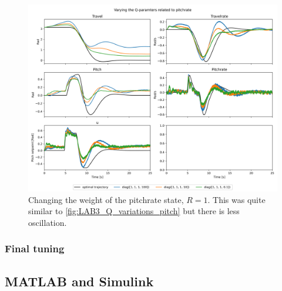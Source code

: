 \documentclass[../main.tex]{subfiles}
\begin{document}
\begin{figure}[h]
	\centering
	\includegraphics[width=0.8\linewidth]{figures/LAB3_Q_variations_pitchrate.png}
	\caption{Changing the weight of the pitchrate state, $R=1$. This was quite similar to \cref{fig:LAB3_Q_variations_pitch} but there is less oscillation.}
	\label{fig:LAB3_Q_variations_pitchrate}
\end{figure}
\subsubsection{Final tuning}

\clearpage

\subsection{MATLAB and Simulink}

\end{document}
